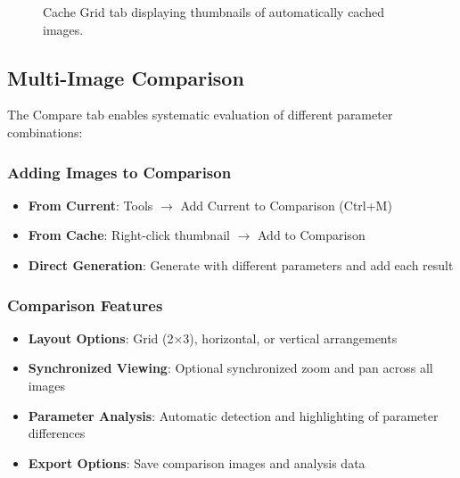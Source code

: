 \documentclass[11pt,a4paper]{article}
\begin{document}
\begin{figure}[H]
\centering
\caption{Cache Grid tab displaying thumbnails of automatically cached
images.}
\label{fig:cache-grid}
\end{figure}

\subsection{Multi-Image Comparison}

The Compare tab enables systematic evaluation of different parameter
combinations:

\subsubsection{Adding Images to Comparison}

\begin{itemize}[leftmargin=*]
\item \textbf{From Current}: Tools $\rightarrow$ Add Current to Comparison
(Ctrl+M)
\item \textbf{From Cache}: Right-click thumbnail $\rightarrow$ Add to
Comparison
\item \textbf{Direct Generation}: Generate with different parameters and
add each result
\end{itemize}

\subsubsection{Comparison Features}

\begin{itemize}[leftmargin=*]
\item \textbf{Layout Options}: Grid (2×3), horizontal, or vertical
arrangements
\item \textbf{Synchronized Viewing}: Optional synchronized zoom and pan
across all images
\item \textbf{Parameter Analysis}: Automatic detection and highlighting of
parameter differences
\item \textbf{Export Options}: Save comparison images and analysis data
\end{itemize}
\end{document}
